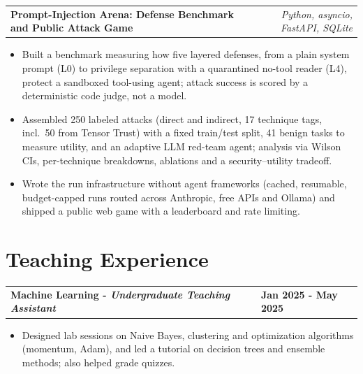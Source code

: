 \documentclass[letterpaper,11pt]{article}
\begin{document}
\begin{tabularx}{\linewidth}{ @{}X r@{} }
\textbf{Prompt-Injection Arena: Defense Benchmark and Public Attack Game} %
 & \textit{\small Python, asyncio, FastAPI, SQLite} \\
\end{tabularx}
\vspace{-1.2em}
\begin{itemize}
    \item[--] Built a benchmark measuring how five layered defenses, from a plain system prompt (L0) to privilege separation with a quarantined no-tool reader (L4), protect a sandboxed tool-using agent; attack success is scored by a deterministic code judge, not a model.\vspace{-0.5em}
    \item[--] Assembled 250 labeled attacks (direct and indirect, 17 technique tags, incl.\ 50 from Tensor Trust) with a fixed train/test split, 41 benign tasks to measure utility, and an adaptive LLM red-team agent; analysis via Wilson CIs, per-technique breakdowns, ablations and a security--utility tradeoff.\vspace{-0.5em}
    \item[--] Wrote the run infrastructure without agent frameworks (cached, resumable, budget-capped runs routed across Anthropic, free APIs and Ollama) and shipped a public web game with a leaderboard and rate limiting.
\end{itemize}
\vspace{-0.2em}

\section{Teaching Experience}

\begin{tabularx}{\linewidth}{ @{}l X@{} }
\textbf{Machine Learning - \textit{Undergraduate Teaching Assistant}} & \hfill \textbf{Jan 2025 - May 2025} \\
\end{tabularx}
\vspace{-1.2em}
\begin{itemize}
    \item[--] Designed lab sessions on Naive Bayes, clustering and optimization algorithms (momentum, Adam), and led a tutorial on decision trees and ensemble methods; also helped grade quizzes.
\end{itemize}
\vspace{-0.3em}
\end{document}
